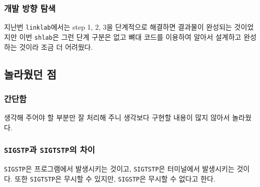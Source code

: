 \documentclass{report}
\begin{document}
\subsubsection{개발 방향 탐색}
지난번 \lstinline{linklab}에서는 step 1, 2, 3을 단계적으로 해결하면 결과물이 완성되는 것이었지만 이번 \lstinline{shlab}은 그런 단계 구분은 없고 뼈대 코드를 이용하여 알아서 설계하고 완성하는 것이라 조금 더 어려웠다.

\subsection{놀라웠던 점}
\subsubsection{간단함}
생각해 주어야 할 부분만 잘 처리해 주니 생각보다 구현할 내용이 많지 않아서 놀라웠다.
\subsubsection{\lstinline{SIGSTP}과 \lstinline{SIGTSTP}의 차이}
\lstinline{SIGSTP}은 프로그램에서 발생시키는 것이고, \lstinline{SIGTSTP}은 터미널에서 발생시키는 것이다. 또한 \lstinline{SIGTSTP}은 무시할 수 있지만, \lstinline{SIGSTP}은 무시할 수 없다고 한다.
\end{document}
